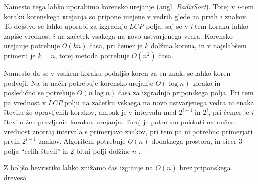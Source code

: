 Namesto tega lahko uporabimo korensko urejanje (angl. \textit{RadixSort}). Torej v $i$-tem koraku korenskega urejanja so pripone urejene v vedrih glede na prvih $i$ znakov. To dejstvo se lahko uporabi za izgradnjo $LCP$ polja, saj se v $i$-tem koraku lahko zapiše vrednost $i$ na začetek vsakega na novo ustvarjenega vedra. Korensko urejanje potrebuje $O(kn)$ časa, pri čemer je $k$ dolžina korena, in v najslabšem primeru je $k=n$, torej metoda potrebuje $O(n^2)$ časa.

Namesto da se v vsakem koraku podaljša koren za en znak, se lahko koren podvoji. Na ta način potrebuje korensko urejanje $O(\log{n})$ korako in posledično se potrebuje $O(n\log{n})$ časa za izgradnjo priponskega polja. Pri tem pa vrednost v $LCP$ polju na začetku vskaega na novo ustvarjenega vedra ni enaka številu že opravljenih korakov, ampak je v intervalu med $2^{i-1}$ in $2^{i}$, pri čemer je $i$ število že opravljenih korakov urejanja. Torej je potrebno poiskati natančno vrednost znotraj intervala s primerjavo znakov, pri tem pa ni potrebno primerjati prvih $2^{i-1}$ znakov. Algoritem potrebuje $O(n)$ dodatnega prostora, in sicer 3 polja \enquote{celih števil} in 2 bitni polji dolžine $n$ \cite{Manber1990}.

Z boljšo hevristiko lahko znižamo čas izgranje na $O(n)$ brez priponskega drevesa\cite{Ko2005}


